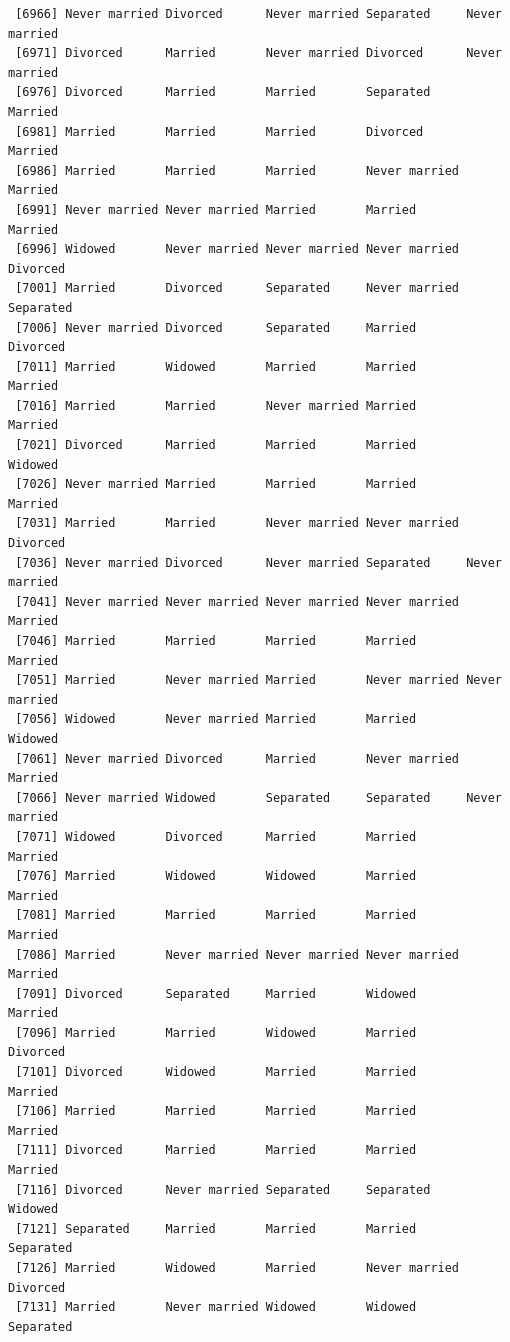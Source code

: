 \documentclass[
  letterpaper,
  DIV=11,
  numbers=noendperiod,
  oneside]{scrartcl}
\begin{document}
\begin{verbatim}
 [6966] Never married Divorced      Never married Separated     Never married
 [6971] Divorced      Married       Never married Divorced      Never married
 [6976] Divorced      Married       Married       Separated     Married      
 [6981] Married       Married       Married       Divorced      Married      
 [6986] Married       Married       Married       Never married Married      
 [6991] Never married Never married Married       Married       Married      
 [6996] Widowed       Never married Never married Never married Divorced     
 [7001] Married       Divorced      Separated     Never married Separated    
 [7006] Never married Divorced      Separated     Married       Divorced     
 [7011] Married       Widowed       Married       Married       Married      
 [7016] Married       Married       Never married Married       Married      
 [7021] Divorced      Married       Married       Married       Widowed      
 [7026] Never married Married       Married       Married       Married      
 [7031] Married       Married       Never married Never married Divorced     
 [7036] Never married Divorced      Never married Separated     Never married
 [7041] Never married Never married Never married Never married Married      
 [7046] Married       Married       Married       Married       Married      
 [7051] Married       Never married Married       Never married Never married
 [7056] Widowed       Never married Married       Married       Widowed      
 [7061] Never married Divorced      Married       Never married Married      
 [7066] Never married Widowed       Separated     Separated     Never married
 [7071] Widowed       Divorced      Married       Married       Married      
 [7076] Married       Widowed       Widowed       Married       Married      
 [7081] Married       Married       Married       Married       Married      
 [7086] Married       Never married Never married Never married Married      
 [7091] Divorced      Separated     Married       Widowed       Married      
 [7096] Married       Married       Widowed       Married       Divorced     
 [7101] Divorced      Widowed       Married       Married       Married      
 [7106] Married       Married       Married       Married       Married      
 [7111] Divorced      Married       Married       Married       Married      
 [7116] Divorced      Never married Separated     Separated     Widowed      
 [7121] Separated     Married       Married       Married       Separated    
 [7126] Married       Widowed       Married       Never married Divorced     
 [7131] Married       Never married Widowed       Widowed       Separated    

\end{verbatim}
\end{document}
